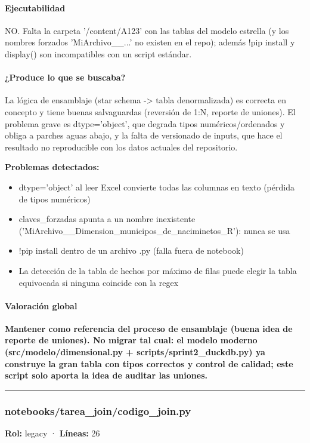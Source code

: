 \paragraph{Ejecutabilidad}
NO. Falta la carpeta '/content/A123' con las tablas del modelo estrella (y los nombres forzados 'MiArchivo\_\_...' no existen en el repo); además !pip install y display() son incompatibles con un script estándar.

\paragraph{¿Produce lo que se buscaba?}
La lógica de ensamblaje (star schema -> tabla denormalizada) es correcta en concepto y tiene buenas salvaguardas (reversión de 1:N, reporte de uniones). El problema grave es dtype='object', que degrada tipos numéricos/ordenados y obliga a parches aguas abajo, y la falta de versionado de inputs, que hace el resultado no reproducible con los datos actuales del repositorio.

\begin{tcolorbox}[riesgo]
\textbf{Problemas detectados:}
\begin{itemize}
  \item dtype='object' al leer Excel convierte todas las columnas en texto (pérdida de tipos numéricos)
  \item claves\_forzadas apunta a un nombre inexistente ('MiArchivo\_\_Dimension\_municipos\_de\_naciminetos\_R'): nunca se usa
  \item !pip install dentro de un archivo .py (falla fuera de notebook)
  \item La detección de la tabla de hechos por máximo de filas puede elegir la tabla equivocada si ninguna coincide con la regex
\end{itemize}
\end{tcolorbox}

\paragraph{Valoración global}
\textbf{Mantener como referencia del proceso de ensamblaje (buena idea de reporte de uniones). No migrar tal cual: el modelo moderno (src/modelo/dimensional.py + scripts/sprint2\_duckdb.py) ya construye la gran tabla con tipos correctos y control de calidad; este script solo aporta la idea de auditar las uniones.}

\medskip
\hrule

\subsubsection{notebooks/tarea\_join/codigo\_join.py}
\textbf{Rol:} legacy · \textbf{Líneas:} 26

